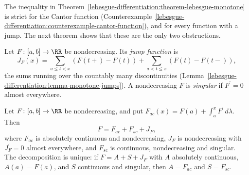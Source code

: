 The inequality in Theorem~\ref{lebesgue-differentiation:theorem-lebesgue-monotone} is strict for the Cantor function (Counterexample~\ref{lebesgue-differentiation:counterexample-cantor-function}), and for
every function with a jump. The next theorem shows that these are the only two obstructions.

\begin{definition}\label{lebesgue-differentiation:definition-jump-function}
Let $F \colon [a, b] \to \RR$ be nondecreasing. Its \emph{jump function} is
\[
J_F(x) = \sum_{a \leq t < x}(F(t+) - F(t)) + \sum_{a < t \leq x}(F(t) - F(t-)),
\]
the sums running over the countably many discontinuities (Lemma~\ref{lebesgue-differentiation:lemma-monotone-jumps}). A nondecreasing $F$ is \emph{singular} if $F^{\prime} = 0$ almost everywhere.
\end{definition}

\begin{theorem}\label{lebesgue-differentiation:theorem-monotone-decomposition}
Let $F \colon [a, b] \to \RR$ be nondecreasing, and put $F_{ac}(x) = F(a) + \int_a^xF^{\prime}\,d\lambda$. Then
\[
F = F_{ac} + F_{sc} + J_F,
\]
where $F_{ac}$ is absolutely continuous and nondecreasing, $J_F$ is nondecreasing with $J_F^{\prime} = 0$ almost everywhere, and $F_{sc}$ is continuous, nondecreasing and singular. The decomposition is unique:
if $F = A + S + J_F$ with $A$ absolutely continuous, $A(a) = F(a)$, and $S$ continuous and singular, then $A = F_{ac}$ and $S = F_{sc}$.
\end{theorem}

